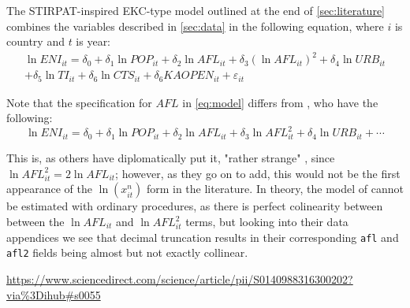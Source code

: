 \documentclass[12pt,a4paper]{article}
\begin{document}
The STIRPAT-inspired EKC-type model outlined at the end of \cref{sec:literature} combines the variables described in \cref{sec:data} in the following equation, where $i$ is country and $t$ is year:
\begin{multline}\label{eq:model}
\ln ENI_{it} = \delta_0 + \delta_1 \ln POP_{it} + \delta_2 \ln AFL_{it} + \delta_3 \left( \ln AFL_{it} \right)^2 + \delta_4 \ln URB_{it} \\ + \delta_5 \ln TI_{it} + \delta_6 \ln CTS_{it} + \delta_6 KAOPEN_{it} + \varepsilon_{it}
\end{multline}

Note that the specification for $AFL$ in \cref{eq:model} differs from \cite[Equation 4]{rafiqUrbanizationOpennessEmissions2016}, who have the following:
\begin{equation*}\label{eq:rafiqmodel}
\ln ENI_{it} = \delta_0 + \delta_1 \ln POP_{it} + \delta_2 \ln AFL_{it} + \delta_3 \ln AFL_{it}^2 + \delta_4 \ln URB_{it} + \cdots
\end{equation*}

This is, as others have diplomatically put it, "rather strange" \cite[p.4936]{moosaEconometricsEnvironmentalKuznets2017}, since $\ln AFL_{it}^2 = 2 \ln AFL_{it}$; however, as they go on to add, this would not be the first appearance of the $\ln \left( x^n_{it} \right)$ form in the literature.
In theory, the model of \cite{rafiqUrbanizationOpennessEmissions2016} cannot be estimated with ordinary procedures, as there is perfect colinearity between between the $\ln AFL_{it}$ and $\ln AFL_{it}^2$ terms, but looking into their data appendices\footnotemark{} we see that decimal truncation results in their corresponding \texttt{afl} and \texttt{afl2} fields being almost but not exactly collinear.

\urldef{\rafiqdata}\url{https://www.sciencedirect.com/science/article/pii/S0140988316300202?via%3Dihub#s0055}
\end{document}
